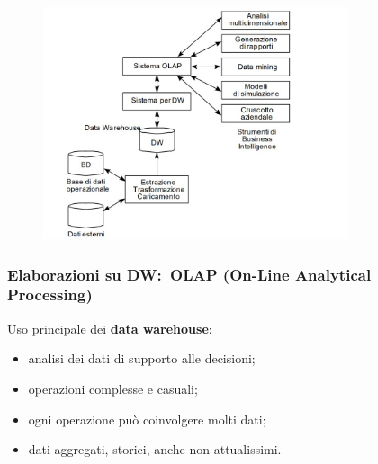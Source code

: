 \begin{figure}[H]
	\centering
	\includegraphics[width=0.8\textwidth]{immagini/Sistema_informatico_direzionale.jpg}
\end{figure}
\subsubsection{Elaborazioni su DW:\ OLAP (On-Line Analytical Processing)}

Uso principale dei \textbf{data warehouse}:
\begin{itemize}
	\item analisi dei dati di supporto alle decisioni;
	\item operazioni complesse e casuali;
	\item ogni operazione può coinvolgere molti dati;
	\item dati aggregati, storici, anche non attualissimi.
\end{itemize}

